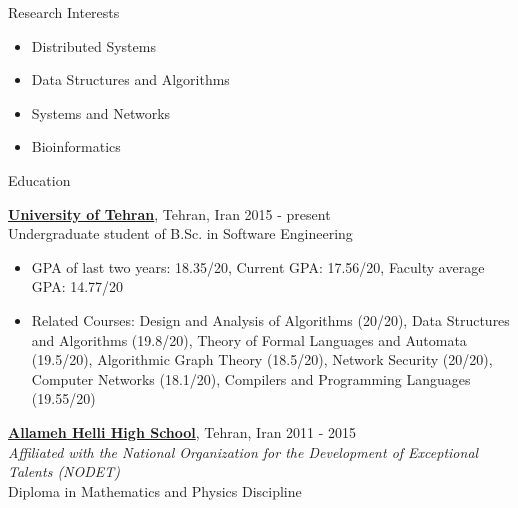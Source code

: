 \documentclass{resume} %
\begin{document}
	

\begin{rSection}{Research Interests}
	\begin{multicols}{2}
		\begin{itemize}[leftmargin=0mm]
			\item Distributed Systems
			\item Data Structures and Algorithms
			\item Systems and Networks
			\item Bioinformatics
		\end{itemize}
	\end{multicols}
\end{rSection}


\begin{rSection}{Education}
	
	{\bf \href{http://ut.ac.ir/en}{University of Tehran}}, Tehran, Iran \hfill 2015 - present
	\\Undergraduate student of B.Sc. in Software Engineering
	
	\begin{itemize}
		\item GPA of last two years: 18.35/20, Current GPA: 17.56/20, Faculty average GPA: 14.77/20
		\item Related Courses: Design and Analysis of Algorithms (20/20), Data Structures and Algorithms (19.8/20),
		Theory of Formal Languages and Automata (19.5/20), Algorithmic Graph Theory (18.5/20), Network Security (20/20), Computer Networks (18.1/20), Compilers and Programming Languages (19.55/20)
	\end{itemize}
	
	{\bf \href{http://www.helli.ir/}{Allameh Helli High School}}, Tehran, Iran \hfill 2011 - 2015
	\\\textit{\scriptsize Affiliated with the National Organization for the Development of Exceptional Talents (NODET)}
	\\Diploma in Mathematics and Physics Discipline
	
\end{rSection}
\end{document}
